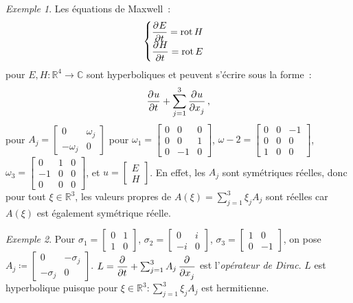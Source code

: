 \documentclass{report}
\DeclareMathOperator{\rot}{rot}
\newcommand{\C}{{\mathbb C}}
\newcommand{\R}{{\mathbb R}}
\theoremstyle{definition}
\theoremstyle{remark}
\newtheorem{ex}{Exemple}[chapter]
\begin{document}
\begin{ex}
Les équations de Maxwell~:
\[\begin{cases}\dpd Et = \rot H\\\dpd Ht = \rot E\end{cases}\]
pour $E, H : \R^4 \to \C$ sont hyperboliques et peuvent s'écrire sous la forme~:
\[\dpd ut + \sum_{j=1}^3\dpd u{x_j},\]
pour $A_j = \begin{bmatrix}0 & \omega_j \\-\omega_j & 0\end{bmatrix}$ pour $\omega_1 = \begin{bmatrix}0 & 0 & 0\\0 & 0 & 1\\0 & -1 & 0\end{bmatrix}$,
$\omega-2 = \begin{bmatrix}0 & 0 & -1\\0 & 0 & 0\\1 & 0 & 0\end{bmatrix}$, $\omega_3 = \begin{bmatrix}0 & 1 & 0\\-1 & 0 & 0\\0 & 0 & 0\end{bmatrix}$, et
$u = \begin{bmatrix}E\\H\end{bmatrix}$. En effet, les $A_j$ sont symétriques réelles, donc pour tout $\xi \in \R^3$, les valeurs propres de $A(\xi) = \sum_{j=1}^3\xi_jA_j$
sont réelles car $A(\xi)$ est également symétrique réelle.
\end{ex}

\begin{ex}
Pour $\sigma_1 = \begin{bmatrix}0 & 1 \\1 & 0\end{bmatrix}$, $\sigma_2 = \begin{bmatrix}0 & i \\-i & 0\end{bmatrix}$, $\sigma_3 = \begin{bmatrix}1 & 0\\0 & -1\end{bmatrix}$,
on pose $A_j \coloneqq \begin{bmatrix}0 & -\sigma_j\\-\sigma_j & 0\end{bmatrix}$. $L = \dpd {}t + \sum_{j=1}^3A_j\dpd {}{x_j}$ est l'\textit{opérateur de Dirac}.
$L$ est hyperbolique puisque pour $\xi \in \R^3 : \sum_{j=1}^3\xi_jA_j$ est hermitienne.
\end{ex}
\end{document}
